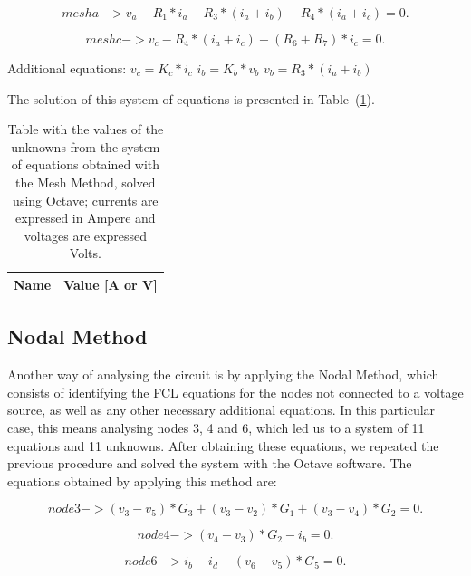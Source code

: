 \begin{equation}
  mesh a -> v_a - R_1*i_a - R_3*(i_a + i_b) - R_4*(i_a +i_c) = 0.
\end{equation}

\begin{equation}
  mesh c -> v_c - R_4*(i_a +i_c) - (R_6 +R_7)*i_c = 0.
\end{equation}

Additional equations:
$v_c = K_c*i_c$
$i_b = K_b*v_b$
$v_b = R_3*(i_a + i_b)$

The solution of this system of equations is presented in Table~(\ref{tab:node}). 

\begin{table}[h]
  \centering
  \begin{tabular}{|l|r|}
    \hline    
    {\bf Name} & {\bf Value [A or V]} \\ \hline
    
  \end{tabular}
  \caption{Table with the values of the unknowns from the system of equations obtained with the Mesh Method, solved using Octave; currents are expressed in Ampere and voltages are expressed Volts.}
  \label{tab:node}
\end{table}


\subsection{Nodal Method}

Another way of analysing the circuit is by applying the Nodal Method, which consists of identifying the FCL equations for the nodes not connected to a voltage source, as well as any other necessary additional equations. In this particular case, this means analysing nodes 3, 4 and 6, which led us to a system of 11 equations and 11 unknowns. After obtaining these equations, we repeated the previous procedure and solved the system with the Octave software. The equations obtained by applying this method are:


\begin{equation}
  node 3 -> (v_3 - v_5)*G_3 + (v_3 - v_2)*G_1 + (v_3 - v_4)*G_2 = 0.
  \label{eq:kvl}
\end{equation}

\begin{equation}
  node 4 -> (v_4 - v_3)*G_2 - i_b = 0.
\end{equation}

\begin{equation}
  node 6 -> i_b - i_d + (v_6 - v_5)*G_5 = 0.
  \label{eq:kvl2}
\end{equation}

